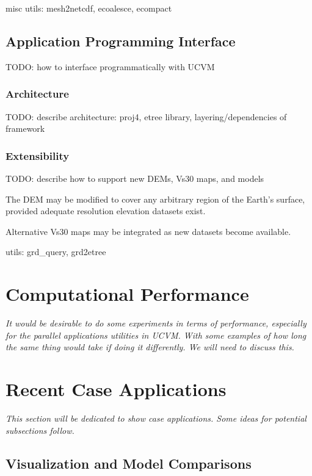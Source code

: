 misc utils: mesh2netcdf, ecoalesce, ecompact

\subsection{Application Programming Interface}

TODO: how to interface programmatically with UCVM

\subsubsection{Architecture}

TODO: describe architecture: proj4, etree library, layering/dependencies of framework

\subsubsection{Extensibility}

TODO: describe how to support new DEMs, Vs30 maps, and models

The DEM may be modified to cover any arbitrary region of the Earth's surface, provided adequate resolution elevation datasets exist.

Alternative Vs30 maps may be integrated as new datasets become available. 

utils: grd\_query, grd2etree

\section{Computational Performance}
\label{sec:conclusions}

\textit{
\color{blue}
It would be desirable to do some experiments in terms of performance, especially for the parallel applications utilities in UCVM. With some examples of how long the same thing would take if doing it differently. We will need to discuss this.
}

\section{Recent Case Applications}
\label{sec:conclusions}

\textit{
\color{blue}
This section will be dedicated to show case applications. Some ideas for potential subsections follow.
}

\subsection{Visualization and Model Comparisons}

